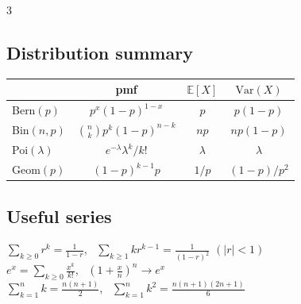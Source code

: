 \documentclass[8pt]{extarticle}
\newcommand{\E}{\mathbb{E}}
\newcommand{\Var}{\mathrm{Var}}
\begin{document}
\begin{multicols*}{3}
\subsection{Distribution summary}
\renewcommand{\arraystretch}{1.5}
\begin{tabular}{@{}l|c|c|c@{}}
 & pmf & $\E[X]$ & $\Var(X)$\\\hline
Bern$(p)$ & $p^x(1-p)^{1-x}$ & $p$ & $p(1-p)$\\
Bin$(n,p)$ & $\binom nk p^k(1-p)^{n-k}$ & $np$ & $np(1-p)$\\
Poi$(\lambda)$ & $e^{-\lambda}\lambda^k/k!$ & $\lambda$ & $\lambda$\\
Geom$(p)$ & $(1-p)^{k-1}p$ & $1/p$ & $(1-p)/p^2$
\end{tabular}
\renewcommand{\arraystretch}{1}

\subsection{Useful series}
$\sum_{k\ge0}r^k=\frac1{1-r}$, \ $\sum_{k\ge1}kr^{k-1}=\frac1{(1-r)^2}$ $(|r|<1)$\\
$e^x=\sum_{k\ge0}\frac{x^k}{k!}$, \ $(1+\frac xn)^n\to e^x$\\
$\sum_{k=1}^nk=\frac{n(n+1)}2$, \ $\sum_{k=1}^nk^2=\frac{n(n+1)(2n+1)}6$

\end{multicols*}
\end{document}
